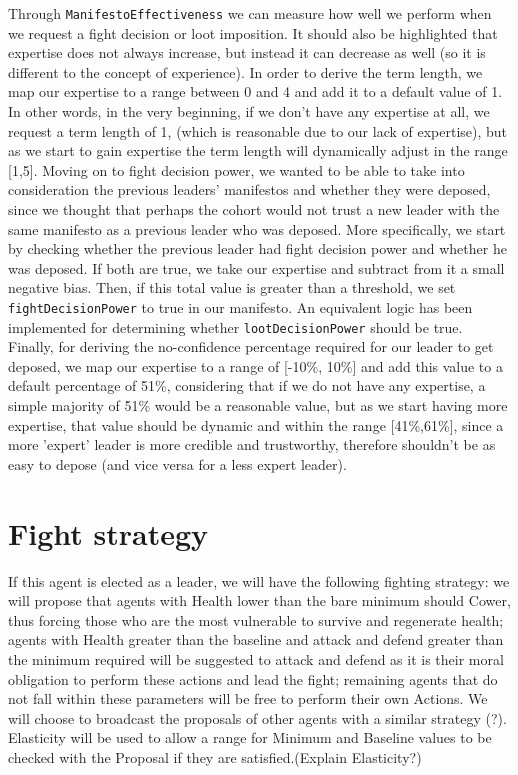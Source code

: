 Through \verb|ManifestoEffectiveness| we can measure how well we perform when we request a fight decision or loot imposition. It should also be highlighted that expertise does not always increase, but instead it can decrease as well (so it is different to the concept of experience). In order to derive the term length, we map our expertise to a range between 0 and 4 and add it to a default value of 1. In other words, in the very beginning, if we don't have any expertise at all, we request a term length of 1, (which is reasonable due to our lack of expertise), but as we start to gain expertise the term length will dynamically adjust in the range [1,5]. Moving on to fight decision power, we wanted to be able to take into consideration the previous leaders' manifestos and whether they were deposed, since we thought that perhaps the cohort would not trust a new leader with the same manifesto as a previous leader who was deposed. More specifically, we start by checking whether the previous leader had fight decision power and whether he was deposed. If both are true, we take our expertise and subtract from it a small negative bias. Then, if this total value is greater than a threshold, we set \verb|fightDecisionPower| to true in our manifesto. An equivalent logic has been implemented for determining whether \verb|lootDecisionPower| should be true. Finally, for deriving the no-confidence percentage required for our leader to get deposed, we map our expertise to a range of [-10\%, 10\%] and add this value to a default percentage of 51\%, considering that if we do not have any expertise, a simple majority of 51\% would be a reasonable value, but as we start having more expertise, that value should be dynamic and within the range [41\%,61\%], since a more 'expert' leader is more credible and trustworthy, therefore shouldn't be as easy to depose (and vice versa for a less expert leader).\\

\section{Fight strategy} If this agent is elected as a leader, we will have the following fighting strategy: we will propose that agents with Health lower than the bare minimum should Cower, thus forcing those who are the most vulnerable to survive and regenerate health; agents with Health greater than the baseline and attack and defend greater than the minimum required will be suggested to attack and defend as it is their moral obligation to perform these actions and lead the fight; remaining agents that do not fall within these parameters will be free to perform their own Actions. We will choose to broadcast the proposals of other agents with a similar strategy (?). Elasticity will be used to allow a range for Minimum and Baseline values to be checked with the Proposal if they are satisfied.(Explain Elasticity?)\\

